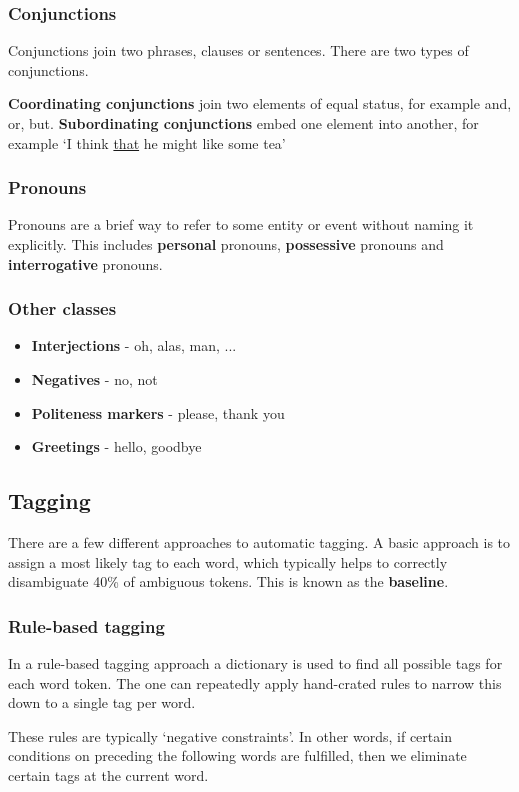 \documentclass[Report.tex]{subfiles}
\begin{document}
\subsubsection{Conjunctions}
Conjunctions join two phrases, clauses or sentences. There are two types of
conjunctions. 

\textbf{Coordinating conjunctions} join two elements of equal status, for
example and, or, but. \textbf{Subordinating conjunctions} embed one
element into another, for example `I think \underline{that} he might like
some tea'

\subsubsection{Pronouns}
Pronouns are a brief way to refer to some entity or event without naming
it explicitly. This includes \textbf{personal} pronouns, \textbf{possessive}
pronouns and \textbf{interrogative} pronouns.

\subsubsection{Other classes}
\begin{itemize}
\item \textbf{Interjections} - oh, alas, man, ...
\item \textbf{Negatives} - no, not
\item \textbf{Politeness markers} - please, thank you
\item \textbf{Greetings} - hello, goodbye
\end{itemize}

\subsection{Tagging}
There are a few different approaches to automatic tagging. A basic approach
is to assign a most likely tag to each word, which typically helps to correctly
disambiguate 40\% of ambiguous tokens. This is known as the \textbf{baseline}.

\subsubsection{Rule-based tagging}
In a rule-based tagging approach a dictionary is used to find all possible
tags for each word token. The one can repeatedly apply hand-crated rules
to narrow this down to a single tag per word.

These rules are typically `negative constraints'. In other words, if certain
conditions on preceding the following words are fulfilled, then we eliminate
certain tags at the current word.
\end{document}
